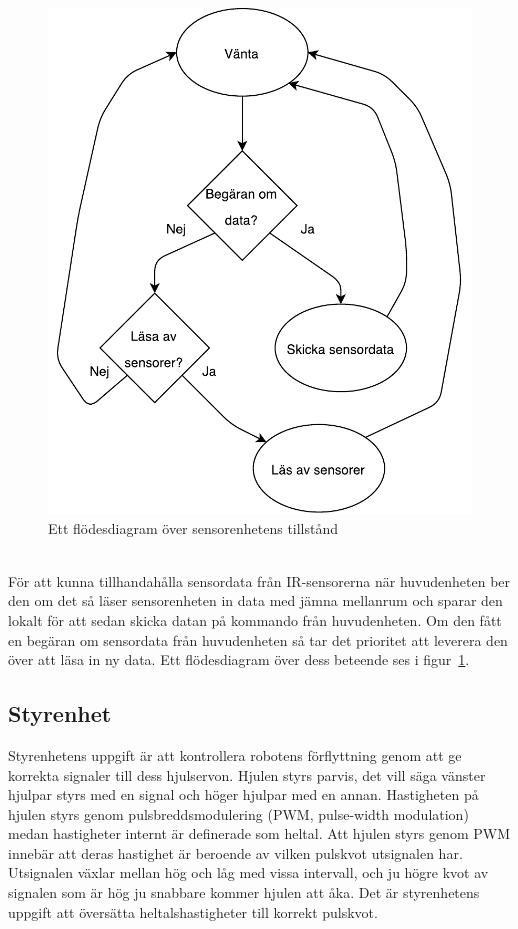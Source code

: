 \documentclass{article}
\begin{document}
\begin{figure}[H]
\centering
\includegraphics[scale=0.6]{sensorenhet_flowchart}
\caption{Ett flödesdiagram över sensorenhetens tillstånd}
\label{fig:sensorenhet_flowchart}
\end{figure}
\ \\
För att kunna tillhandahålla sensordata från IR-sensorerna när huvudenheten ber den om det så läser sensorenheten in data med jämna mellanrum och sparar den lokalt för att sedan skicka datan på kommando från huvudenheten. Om den fått en begäran om sensordata från huvudenheten så tar det prioritet att leverera den över att läsa in ny data. Ett flödesdiagram över dess beteende ses i figur~\ref{fig:sensorenhet_flowchart}.

\subsection{Styrenhet}
Styrenhetens uppgift är att kontrollera robotens förflyttning genom att ge korrekta signaler till dess hjulservon. Hjulen styrs parvis, det vill säga vänster hjulpar styrs med en signal och höger hjulpar med en annan. Hastigheten på hjulen styrs genom pulsbreddsmodulering (PWM, pulse-width modulation) medan hastigheter internt är definerade som heltal. Att hjulen styrs genom PWM innebär att deras hastighet är beroende av vilken pulskvot utsignalen har. Utsignalen växlar mellan hög och låg med vissa intervall, och ju högre kvot av signalen som är hög ju snabbare kommer hjulen att åka. Det är styrenhetens uppgift att översätta heltalshastigheter till korrekt pulskvot.
\end{document}
